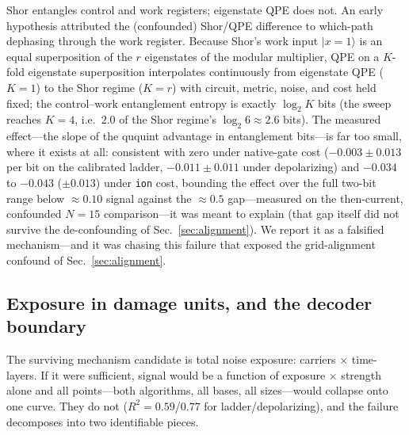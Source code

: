 \documentclass[aps,pra,reprint,superscriptaddress,nofootinbib,floatfix]{revtex4-2}
\begin{document}
Shor entangles control and work registers; eigenstate QPE does not. An
early hypothesis attributed the (confounded) Shor/QPE difference to
which-path dephasing through the work register. Because Shor's work
input $\lvert x{=}1\rangle$ is an equal superposition of the $r$
eigenstates of the modular multiplier, QPE on a $K$-fold eigenstate
superposition interpolates continuously from eigenstate QPE ($K=1$) to
the Shor regime ($K=r$) with circuit, metric, noise, and cost held
fixed; the control--work entanglement entropy is exactly $\log_2 K$
bits (the sweep reaches $K=4$, i.e.\ $2.0$ of the Shor regime's
$\log_2 6\approx2.6$ bits). The measured effect---the slope of the ququint advantage in
entanglement bits---is far too small, where it exists at all:
consistent with zero under native-gate cost ($-0.003\pm0.013$ per bit
on the calibrated ladder, $-0.011\pm0.011$ under depolarizing) and
$-0.034$ to $-0.043$ ($\pm0.013$) under \texttt{ion} cost, bounding
the effect over the full two-bit range below ${\approx}0.10$
signal against the ${\approx}0.5$ gap---measured on the then-current,
confounded $N=15$ comparison---it was meant to explain (that gap
itself did not survive the de-confounding of
Sec.~\ref{sec:alignment}). We report it as a
falsified mechanism---and it was chasing this failure that exposed the
grid-alignment confound of Sec.~\ref{sec:alignment}.

\subsection{Exposure in damage units, and the decoder boundary}

The surviving mechanism candidate is total noise exposure: carriers
$\times$ time-layers. If it were sufficient, signal would be a function
of exposure $\times$ strength alone and all points---both algorithms,
all bases, all sizes---would collapse onto one curve. They do not
($R^2=0.59$/$0.77$ for ladder/depolarizing), and the failure decomposes
into two identifiable pieces.
\end{document}

